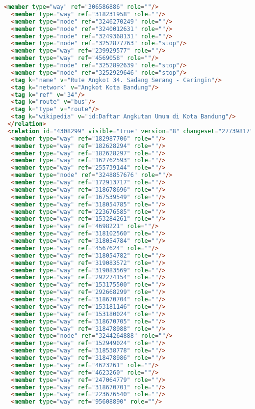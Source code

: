 \begin{lstlisting}[language=HTML,basicstyle=\tiny,caption=test.xml]
  <member type="way" ref="306586886" role=""/>
  <member type="way" ref="318231958" role=""/>
  <member type="node" ref="3246270249" role=""/>
  <member type="node" ref="3240012631" role=""/>
  <member type="node" ref="3249368131" role=""/>
  <member type="node" ref="3252877763" role="stop"/>
  <member type="way" ref="239929577" role=""/>
  <member type="way" ref="4569058" role=""/>
  <member type="node" ref="3252892639" role="stop"/>
  <member type="node" ref="3252929646" role="stop"/>
  <tag k="name" v="Rute Angkot 34. Sadang Serang - Caringin"/>
  <tag k="network" v="Angkot Kota Bandung"/>
  <tag k="ref" v="34"/>
  <tag k="route" v="bus"/>
  <tag k="type" v="route"/>
  <tag k="wikipedia" v="id:Daftar Angkutan Umum di Kota Bandung"/>
 </relation>
 <relation id="4308299" visible="true" version="8" changeset="27739817" timestamp="2014-12-27T20:32:33Z" user="gnocin" uid="2526082">
  <member type="way" ref="182987706" role=""/>
  <member type="way" ref="182628294" role=""/>
  <member type="way" ref="182628297" role=""/>
  <member type="way" ref="162762593" role=""/>
  <member type="way" ref="255739144" role=""/>
  <member type="node" ref="3248857676" role=""/>
  <member type="way" ref="172913717" role=""/>
  <member type="way" ref="318678696" role=""/>
  <member type="way" ref="167539549" role=""/>
  <member type="way" ref="318054785" role=""/>
  <member type="way" ref="223676585" role=""/>
  <member type="way" ref="153284261" role=""/>
  <member type="way" ref="4698221" role=""/>
  <member type="way" ref="318102560" role=""/>
  <member type="way" ref="318054784" role=""/>
  <member type="way" ref="4567624" role=""/>
  <member type="way" ref="318054782" role=""/>
  <member type="way" ref="319083572" role=""/>
  <member type="way" ref="319083569" role=""/>
  <member type="way" ref="292274154" role=""/>
  <member type="way" ref="153175500" role=""/>
  <member type="way" ref="292668299" role=""/>
  <member type="way" ref="318670704" role=""/>
  <member type="way" ref="153181146" role=""/>
  <member type="way" ref="153180024" role=""/>
  <member type="way" ref="318670705" role=""/>
  <member type="way" ref="318478988" role=""/>
  <member type="node" ref="3244264888" role=""/>
  <member type="way" ref="152949024" role=""/>
  <member type="way" ref="318538778" role=""/>
  <member type="way" ref="318478986" role=""/>
  <member type="way" ref="4623261" role=""/>
  <member type="way" ref="4623260" role=""/>
  <member type="way" ref="247064779" role=""/>
  <member type="way" ref="318670701" role=""/>
  <member type="way" ref="223676540" role=""/>
  <member type="way" ref="95608890" role=""/>

\end{lstlisting}
